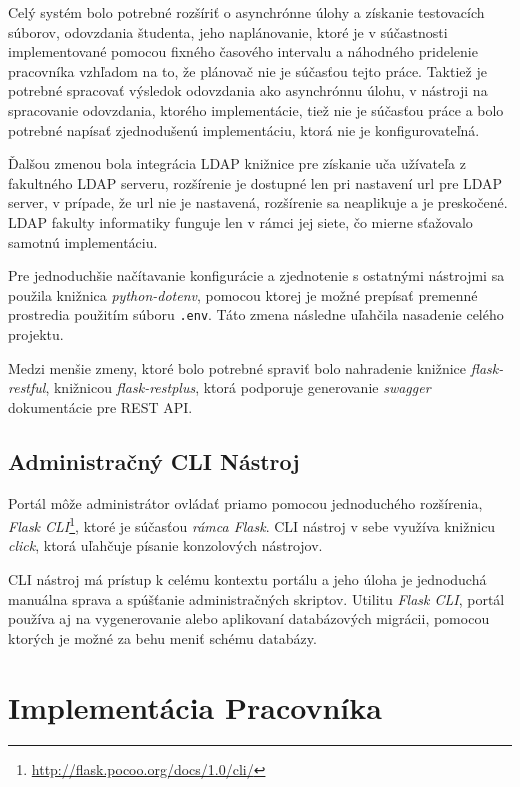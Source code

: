 \documentclass[
  digital, %
  twoside, %
  table,   %
  lof,     %
  lot,     %
]{fithesis3}
\begin{document}
Celý systém bolo potrebné rozšíriť o asynchrónne úlohy a získanie testovacích súborov, odovzdania študenta, jeho naplánovanie, ktoré je v súčastnosti implementované pomocou fixného časového intervalu a náhodného pridelenie pracovníka vzhľadom na to, že plánovač nie je súčasťou tejto práce. Taktiež je potrebné spracovať výsledok odovzdania ako asynchrónnu úlohu, v nástroji na spracovanie odovzdania, ktorého implementácie, tiež nie je súčasťou práce a bolo potrebné napísať zjednodušenú implementáciu, ktorá nie je konfigurovateľná.

Ďalšou zmenou bola integrácia LDAP knižnice pre získanie uča užívateľa z fakultného LDAP serveru, rozšírenie je dostupné len pri nastavení url pre LDAP server, v prípade, že url nie je nastavená, rozšírenie sa neaplikuje a je preskočené. LDAP fakulty informatiky funguje len v rámci jej siete, čo mierne sťažovalo samotnú implementáciu.

Pre jednoduchšie načítavanie konfigurácie a zjednotenie s ostatnými nástrojmi sa použila knižnica \emph{python-dotenv}, pomocou ktorej je možné prepísať premenné prostredia použitím súboru \texttt{.env}. Táto zmena následne uľahčila nasadenie celého projektu.

Medzi menšie zmeny, ktoré bolo potrebné spraviť bolo nahradenie knižnice \emph{flask-restful}, knižnicou \emph{flask-restplus}, ktorá podporuje generovanie \emph{swagger} dokumentácie pre REST API. 

\subsection{Administračný CLI Nástroj}

Portál môže administrátor ovládať priamo pomocou jednoduchého rozšírenia, \emph{Flask CLI}\footnote{\url{http://flask.pocoo.org/docs/1.0/cli/}}, ktoré je súčasťou \emph{rámca Flask}. CLI nástroj v sebe využíva knižnicu \emph{click}, ktorá uľahčuje písanie konzolových nástrojov. 

CLI nástroj má prístup k celému kontextu portálu a jeho úloha je jednoduchá manuálna sprava a spúšťanie administračných skriptov. Utilitu \emph{Flask CLI}, portál používa aj na vygenerovanie alebo aplikovaní databázových migrácii, pomocou ktorých je možné za behu meniť schému databázy. 

\section{Implementácia Pracovníka}
\end{document}
